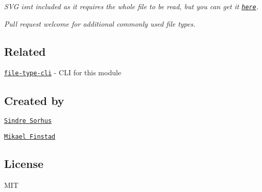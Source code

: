 {\itshape S\+VG isn\textquotesingle{}t included as it requires the whole file to be read, but you can get it \href{https://github.com/sindresorhus/is-svg}{\tt here}.}

{\itshape Pull request welcome for additional commonly used file types.}

\subsection*{Related}


\begin{DoxyItemize}
\item \href{https://github.com/sindresorhus/file-type-cli}{\tt file-\/type-\/cli} -\/ C\+LI for this module
\end{DoxyItemize}

\subsection*{Created by}


\begin{DoxyItemize}
\item \href{https://github.com/sindresorhus}{\tt Sindre Sorhus}
\item \href{https://github.com/mifi}{\tt Mikael Finstad}
\end{DoxyItemize}

\subsection*{License}

M\+IT 